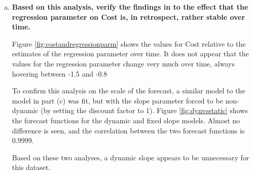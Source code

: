\documentclass{article}
\begin{document}
\begin{enumerate}[(a)]
		\item \textbf{Based on this analysis, verify the findings in \cite{WHP1987b} to the effect that the regression parameter on Cost is, in retrospect, rather stable over time.}
		
		Figure \ref{fig:costandregressionparm} shows the values for Cost relative to the estimates of the regression parameter over time. It does not appear that the values for the regression parameter change very much over time, always hovering between -1.5 and -0.8
		
		To confirm this analysis on the scale of the forecast, a similar model to the model in part (c) was fit, but with the slope parameter forced to be non-dynamic (by setting the discount factor to 1). Figure \ref{fig:dynvsstatic} shows the forecast functions for the dynamic and fixed slope models. Almost no difference is seen, and the correlation between the two forecast functions is 0.9999.
		
		Based on these two analyses, a dynamic slope appears to be unnecessary for this dataset.
		

\end{enumerate}
\end{document}
